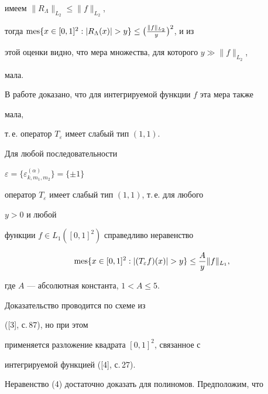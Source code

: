 имеем $\|R_\Lambda\|_{L_2}\le\|f\|_{L_2}$, 


тогда $\mes\{x\in[0,1]^2:|R_\Lambda(x)|>y\}\le 


\big(\frac{\|f\|_{L_2}}{y}\big)^2$, и из 


этой оценки видно, что мера множества, для которого $y\gg\|f\|_{L_2}$, 


мала. 


В работе доказано, что для интегрируемой функции $f$ эта мера также 


мала, 


т.\,е. оператор $T_\varepsilon$ имеет слабый тип $(1,1)$. 


 


\begin{thm} 


Для любой последовательности 


$\varepsilon=\{\varepsilon^{(\alpha)}_{k,m_1,m_2}\}=\{\pm1\}$ 


оператор $T_\varepsilon$ имеет слабый тип $(1,1)$, т.\,е. для любого 


$y>0$ и любой 


функции $f\in L_1([0,1]^2)$ справедливо неравенство 


\begin{equation} 


\mes\{x\in[0,1]^2:|(T_\varepsilon f)(x)|>y\}\le \frac{A}{y}\|f\|_{L_1}, 


\end{equation} 


где $A$ --- абсолютная константа, $1<A\le 5$. 


\end{thm} 


 


Доказательство проводится по схеме из 


([3], с.\,87), но при этом 


применяется разложение квадрата $[0,1]^2$, связанное с 


интегрируемой функцией ([4], с.\,27). 


Неравенство (4) достаточно доказать для полиномов. Предположим, что 


